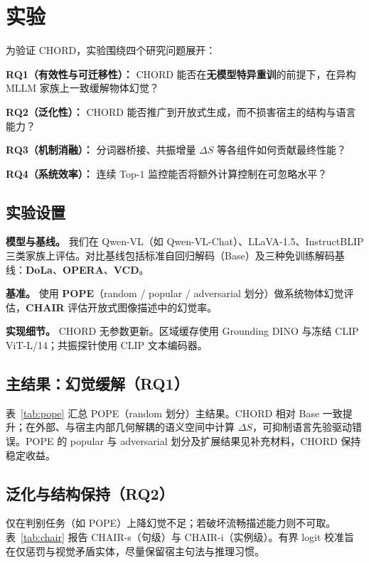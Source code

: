 \section{实验}
\label{sec:exp}

为验证 CHORD，实验围绕四个研究问题展开：

\textbf{RQ1（有效性与可迁移性）：} CHORD 能否在\textbf{无模型特异重训}的前提下，在异构 MLLM 家族上一致缓解物体幻觉？

\textbf{RQ2（泛化性）：} CHORD 能否推广到开放式生成，而不损害宿主的结构与语言能力？

\textbf{RQ3（机制消融）：} 分词器桥接、共振增量 $\Delta S$ 等各组件如何贡献最终性能？

\textbf{RQ4（系统效率）：} 连续 Top-$1$ 监控能否将额外计算控制在可忽略水平？

\subsection{实验设置}

\textbf{模型与基线。} 我们在 Qwen-VL（如 Qwen-VL-Chat）、LLaVA-1.5、InstructBLIP 三类家族上评估。对比基线包括标准自回归解码（Base）及三种免训练解码基线：\textbf{DoLa}、\textbf{OPERA}、\textbf{VCD}。

\textbf{基准。} 使用 \textbf{POPE}（random / popular / adversarial 划分）做系统物体幻觉评估，\textbf{CHAIR} 评估开放式图像描述中的幻觉率。

\textbf{实现细节。} CHORD 无参数更新。区域缓存使用 Grounding DINO 与冻结 CLIP ViT-L/14；共振探针使用 CLIP 文本编码器。

\subsection{主结果：幻觉缓解（RQ1）}

表~\ref{tab:pope} 汇总 POPE（random 划分）主结果。CHORD 相对 Base 一致提升；在外部、与宿主内部几何解耦的语义空间中计算 $\Delta S$，可抑制语言先验驱动错误。POPE 的 popular 与 adversarial 划分及扩展结果见补充材料，CHORD 保持稳定收益。

\subsection{泛化与结构保持（RQ2）}

仅在判别任务（如 POPE）上降幻觉不足；若破坏流畅描述能力则不可取。表~\ref{tab:chair} 报告 CHAIR-s（句级）与 CHAIR-i（实例级）。有界 logit 校准旨在仅惩罚与视觉矛盾实体，尽量保留宿主句法与推理习惯。

